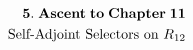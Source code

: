 \documentclass[preview]{standalone}
\begin{document}
\begin{align*}
\special{dvisvgm:raw <g id='unique000'>}\mathbf{5.\;Ascent\;to\;Chapter\;11}\\\text{Self-Adjoint Selectors on }R_{12}\special{dvisvgm:raw </g>}
\end{align*}
\end{document}
